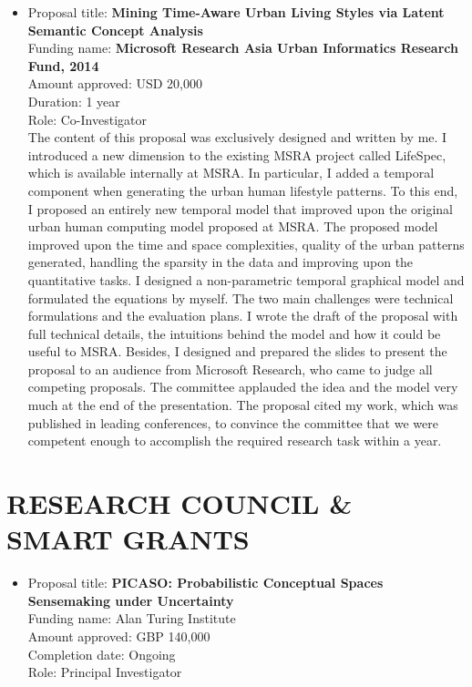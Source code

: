 \documentclass[margin]{res}
\begin{document}
\begin{resume}
\begin{itemize}
\item Proposal title: \textbf{Mining Time-Aware Urban Living Styles via Latent Semantic Concept Analysis}\\
Funding name: \textbf{Microsoft Research Asia Urban Informatics Research Fund, 2014}\\
Amount approved: USD 20,000\\
Duration: 1 year\\
Role: Co-Investigator \\
The content of this proposal was exclusively designed and written by me. I introduced a new dimension to the existing MSRA project called LifeSpec, which is available internally at MSRA. In particular, I added a temporal component when generating the urban human lifestyle patterns. To this end, I proposed an entirely new temporal model that improved upon the original urban human computing model proposed at MSRA. The proposed model improved upon the time and space complexities, quality of the urban patterns generated, handling the sparsity in the data and improving upon the quantitative tasks. I designed a non-parametric temporal graphical model and formulated the equations by myself. The two main challenges were technical formulations and the evaluation plans. I wrote the draft of the proposal with full technical details, the intuitions behind the model and how it could be useful to MSRA. Besides, I designed and prepared the slides to present the proposal to an audience from Microsoft Research, who came to judge all competing proposals. The committee applauded the idea and the model very much at the end of the presentation. The proposal cited my work, which was published in leading conferences, to convince the committee that we were competent enough to accomplish the required research task within a year.
\end{itemize}

\section{RESEARCH COUNCIL \& SMART GRANTS}
\begin{itemize}
\item Proposal title: \textbf{PICASO: Probabilistic Conceptual Spaces Sensemaking under Uncertainty}\\
Funding name: Alan Turing Institute\\
Amount approved: GBP 140,000 \\
Completion date: Ongoing \\
Role: Principal Investigator


\end{itemize}
\end{resume}
\end{document}
